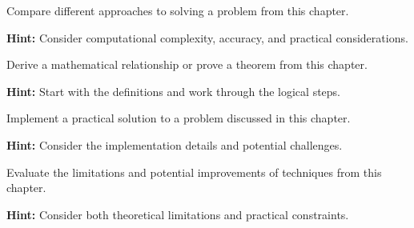 \begin{problem}
Compare different approaches to solving a problem from this chapter.

\textbf{Hint:} Consider computational complexity, accuracy, and practical considerations.
\end{problem}

\begin{problem}
Derive a mathematical relationship or prove a theorem from this chapter.

\textbf{Hint:} Start with the definitions and work through the logical steps.
\end{problem}

\begin{problem}
Implement a practical solution to a problem discussed in this chapter.

\textbf{Hint:} Consider the implementation details and potential challenges.
\end{problem}

\begin{problem}
Evaluate the limitations and potential improvements of techniques from this chapter.

\textbf{Hint:} Consider both theoretical limitations and practical constraints.
\end{problem}
